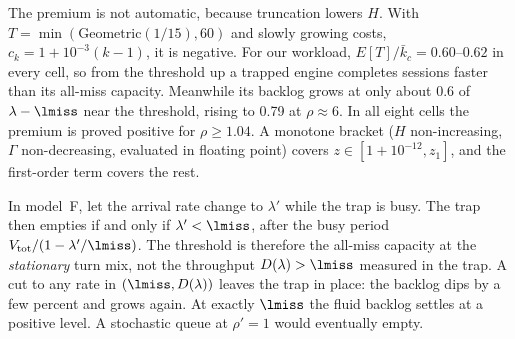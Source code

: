 The premium is not automatic, because truncation lowers $H$. With $T=\min(\mathrm{Geometric}(1/15),60)$ and slowly growing
costs, $c_k=1+10^{-3}(k-1)$, it is negative. For our workload, $E[T]/\bar k_c=0.60$--$0.62$ in every cell, so from the
threshold up a trapped engine completes sessions faster than its all-miss capacity. Meanwhile its backlog grows at only about
0.6 of $\lambda-\lmiss$ near the threshold, rising to 0.79 at $\rho\approx6$. In all eight cells the premium is proved positive
for $\rho\ge1.04$. A monotone bracket ($H$ non-increasing, $\Gamma$ non-decreasing, evaluated in floating point) covers
$z\in[1+10^{-12},z_1]$, and the first-order term covers the rest.

\begin{corollary}\label{cor:trapthr}
In model~F, let the arrival rate change to $\lambda'$ while the trap is busy. The trap then empties if and only if
$\lambda'<\lmiss$, after the busy period $V_{\mathrm{tot}}/(1-\lambda'/\lmiss)$. The threshold is therefore the all-miss
capacity at the \emph{stationary} turn mix, not the throughput $D(\lambda)>\lmiss$ measured in the trap. A cut to any rate in
$(\lmiss, D(\lambda))$ leaves the trap in place: the backlog dips by a few percent and grows again. At exactly $\lmiss$ the
fluid backlog settles at a positive level. A stochastic queue at $\rho'=1$ would eventually empty.
\end{corollary}

